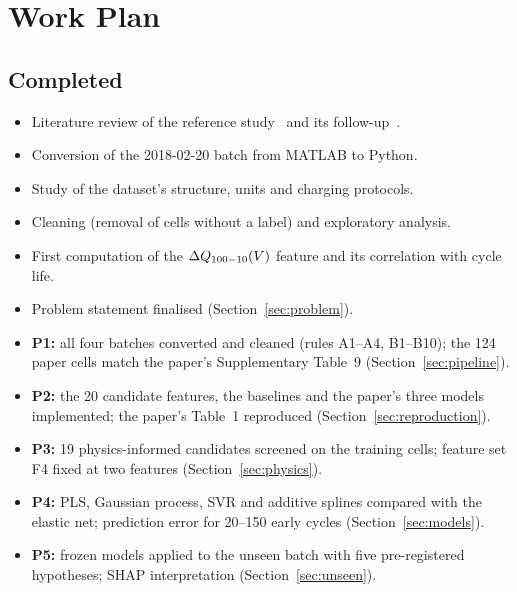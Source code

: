 \section{Work Plan}
\label{sec:plan}

\subsection{Completed}
\begin{itemize}
  \item Literature review of the reference study~\cite{severson2019} and its
  follow-up~\cite{attia2020}.
  \item Conversion of the 2018-02-20 batch from MATLAB to Python.
  \item Study of the dataset's structure, units and charging protocols.
  \item Cleaning (removal of cells without a label) and exploratory
  analysis.
  \item First computation of the $\Delta Q_{100-10}(V)$ feature and its correlation with
  cycle life.
  \item Problem statement finalised (Section~\ref{sec:problem}).
  \item \textbf{P1:} all four batches converted and cleaned (rules A1--A4,
  B1--B10); the 124 paper cells match the paper's Supplementary Table~9
  (Section~\ref{sec:pipeline}).
  \item \textbf{P2:} the 20 candidate features, the baselines and the
  paper's three models implemented; the paper's Table~1 reproduced
  (Section~\ref{sec:reproduction}).
  \item \textbf{P3:} 19 physics-informed candidates screened on the
  training cells; feature set F4 fixed at two features
  (Section~\ref{sec:physics}).
  \item \textbf{P4:} PLS, Gaussian process, SVR and additive splines
  compared with the elastic net; prediction error for 20--150 early cycles
  (Section~\ref{sec:models}).
  \item \textbf{P5:} frozen models applied to the unseen batch with five
  pre-registered hypotheses; SHAP interpretation (Section~\ref{sec:unseen}).
\end{itemize}

